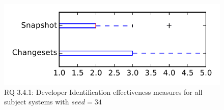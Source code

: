 
\begin{figure}
\centering
\includegraphics[height=0.4\textheight]{figures/dit_seed/rq1_tiny_34}
\caption{RQ 3.4.1: Developer Identification effectiveness measures for all subject systems with $seed=34$}
\label{fig:dit_seed:rq1:tiny}
\end{figure}
